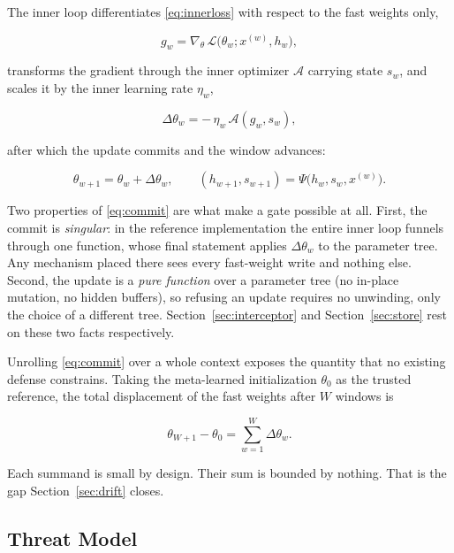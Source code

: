 \documentclass[journal]{IEEEtran}
\newcommand{\fast}{\theta}
\newcommand{\anchorp}{\theta_{0}}
\newcommand{\dtheta}{\Delta\theta}
\begin{document}
The inner loop differentiates \eqref{eq:innerloss} with respect to the fast weights
only,

\begin{equation}
g_w = \nabla_{\fast}\, \mathcal{L}\big(\fast_w; x^{(w)}, h_w\big),
\label{eq:innergrad}
\end{equation}

transforms the gradient through the inner optimizer $\mathcal{A}$ carrying state
$s_w$, and scales it by the inner learning rate $\eta_w$,

\begin{equation}
\dtheta_w = -\,\eta_w\, \mathcal{A}\!\left(g_w, s_w\right),
\label{eq:delta}
\end{equation}

after which the update commits and the window advances:

\begin{equation}
\fast_{w+1} = \fast_w + \dtheta_w,
\qquad
(h_{w+1}, s_{w+1}) = \Psi\big(h_w, s_w, x^{(w)}\big).
\label{eq:commit}
\end{equation}

Two properties of \eqref{eq:commit} are what make a gate possible at all. First,
the commit is \emph{singular}: in the reference implementation the entire inner loop
funnels through one function, whose final statement applies $\dtheta_w$ to the
parameter tree. Any mechanism placed there sees every fast-weight write and nothing
else. Second, the update is a \emph{pure function} over a parameter tree (no
in-place mutation, no hidden buffers), so refusing an update requires no unwinding,
only the choice of a different tree. Section~\ref{sec:interceptor} and
Section~\ref{sec:store} rest on these two facts respectively.

Unrolling \eqref{eq:commit} over a whole context exposes the quantity that no
existing defense constrains. Taking the meta-learned initialization $\anchorp$ as
the trusted reference, the total displacement of the fast weights after $W$ windows
is

\begin{equation}
\fast_{W+1} - \anchorp = \sum_{w=1}^{W} \dtheta_w .
\label{eq:displacement}
\end{equation}

Each summand is small by design. Their sum is bounded by nothing. That is the gap
Section~\ref{sec:drift} closes.

\subsection{Threat Model}
\label{sec:threat}
\end{document}
